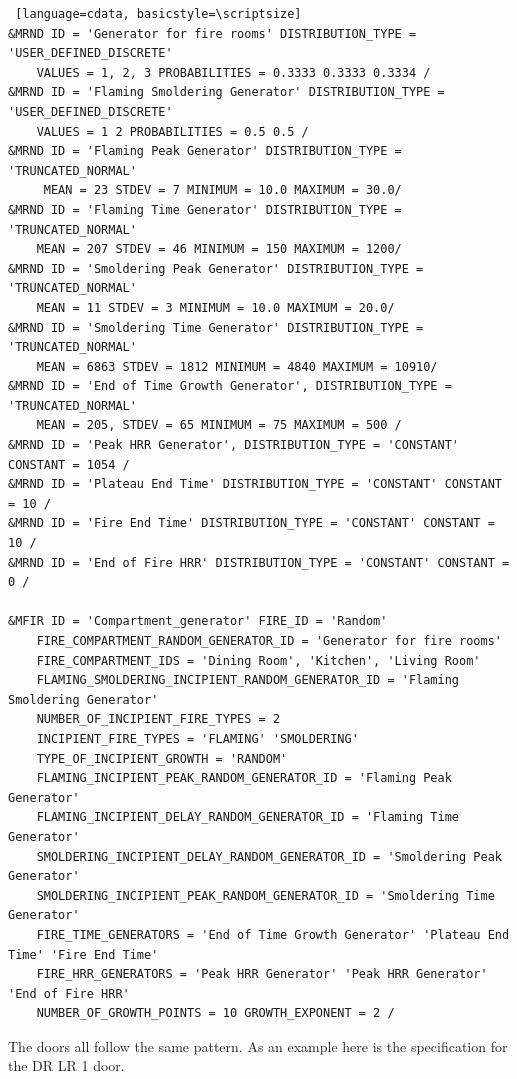 \documentclass[12pt,twoside]{book}
\begin{document}
\vspace{\baselineskip}
\begin{lstlisting} [language=cdata, basicstyle=\scriptsize]
&MRND ID = 'Generator for fire rooms' DISTRIBUTION_TYPE = 'USER_DEFINED_DISCRETE'
    VALUES = 1, 2, 3 PROBABILITIES = 0.3333 0.3333 0.3334 /
&MRND ID = 'Flaming Smoldering Generator' DISTRIBUTION_TYPE = 'USER_DEFINED_DISCRETE'
    VALUES = 1 2 PROBABILITIES = 0.5 0.5 /
&MRND ID = 'Flaming Peak Generator' DISTRIBUTION_TYPE = 'TRUNCATED_NORMAL'
     MEAN = 23 STDEV = 7 MINIMUM = 10.0 MAXIMUM = 30.0/
&MRND ID = 'Flaming Time Generator' DISTRIBUTION_TYPE = 'TRUNCATED_NORMAL'
    MEAN = 207 STDEV = 46 MINIMUM = 150 MAXIMUM = 1200/
&MRND ID = 'Smoldering Peak Generator' DISTRIBUTION_TYPE = 'TRUNCATED_NORMAL'
    MEAN = 11 STDEV = 3 MINIMUM = 10.0 MAXIMUM = 20.0/
&MRND ID = 'Smoldering Time Generator' DISTRIBUTION_TYPE = 'TRUNCATED_NORMAL'
    MEAN = 6863 STDEV = 1812 MINIMUM = 4840 MAXIMUM = 10910/
&MRND ID = 'End of Time Growth Generator', DISTRIBUTION_TYPE = 'TRUNCATED_NORMAL'
    MEAN = 205, STDEV = 65 MINIMUM = 75 MAXIMUM = 500 /
&MRND ID = 'Peak HRR Generator', DISTRIBUTION_TYPE = 'CONSTANT' CONSTANT = 1054 /
&MRND ID = 'Plateau End Time' DISTRIBUTION_TYPE = 'CONSTANT' CONSTANT = 10 /
&MRND ID = 'Fire End Time' DISTRIBUTION_TYPE = 'CONSTANT' CONSTANT = 10 /
&MRND ID = 'End of Fire HRR' DISTRIBUTION_TYPE = 'CONSTANT' CONSTANT = 0 /

&MFIR ID = 'Compartment_generator' FIRE_ID = 'Random'
    FIRE_COMPARTMENT_RANDOM_GENERATOR_ID = 'Generator for fire rooms'
    FIRE_COMPARTMENT_IDS = 'Dining Room', 'Kitchen', 'Living Room'
    FLAMING_SMOLDERING_INCIPIENT_RANDOM_GENERATOR_ID = 'Flaming Smoldering Generator'
    NUMBER_OF_INCIPIENT_FIRE_TYPES = 2
    INCIPIENT_FIRE_TYPES = 'FLAMING' 'SMOLDERING'
    TYPE_OF_INCIPIENT_GROWTH = 'RANDOM'
    FLAMING_INCIPIENT_PEAK_RANDOM_GENERATOR_ID = 'Flaming Peak Generator'
    FLAMING_INCIPIENT_DELAY_RANDOM_GENERATOR_ID = 'Flaming Time Generator'
    SMOLDERING_INCIPIENT_DELAY_RANDOM_GENERATOR_ID = 'Smoldering Peak Generator'
    SMOLDERING_INCIPIENT_PEAK_RANDOM_GENERATOR_ID = 'Smoldering Time Generator'
    FIRE_TIME_GENERATORS = 'End of Time Growth Generator' 'Plateau End Time' 'Fire End Time'
    FIRE_HRR_GENERATORS = 'Peak HRR Generator' 'Peak HRR Generator' 'End of Fire HRR'
    NUMBER_OF_GROWTH_POINTS = 10 GROWTH_EXPONENT = 2 /
\end{lstlisting}

The doors all follow the same pattern. As an example here is the specification for the DR LR 1 door.
\end{document}
